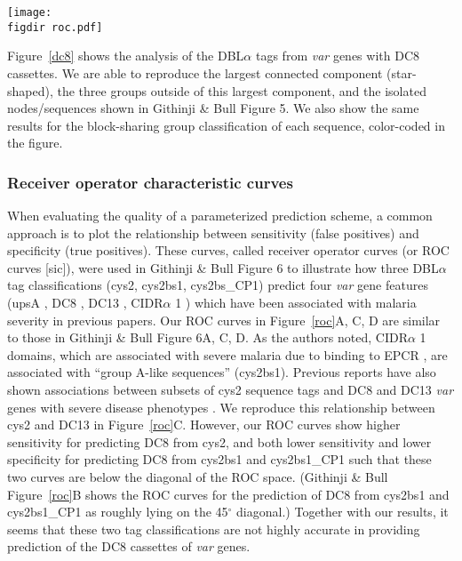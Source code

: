 \documentclass[10pt,twocolumn,superscriptaddress]{revtex4-1}
\newcommand{\var}{{\it var}\xspace}
\newcommand{\dbla}{{DBL$\alpha$}\xspace}
\newcommand{\cidra}{{CIDR$\alpha$}\xspace}
\newcommand{\cp}{{Cys/PoLV}\xspace}
\newcommand{\paper}{{Githinji \& Bull}\xspace}
\newcommand{\figdir}{figures/}
\begin{document}
\begin{figure*}[t]
	\centering
	\texttt{[image: \\figdir roc.pdf]}
	\caption{{\bf Receiver operator curves showing the sensitivity (true positive rate) and specificity (false positive rate) of three \dbla tag classifications (cys2, cys2bs1, cys2bs1\_CP1) in predicting four \var gene features associated with malaria severity: upsA , DC8, DC13 , \cidra1.} Sequences from the genomes 3D7 and IT4 were excluded because they were used in developing the BS classification.  cys2 = two cysteines within the tag region; cys2bs1 = tag sequences in block-sharing group1 AND have two cysteines, defined as ``group A-like''; cys2bs1\_CP1 = cys2bs1 OR in \cp group 1.}
	\label{roc}
\end{figure*}

Figure~\ref{dc8} shows the analysis of the \dbla tags from \var genes with DC8 cassettes. We are able to reproduce the largest connected component (star-shaped), the three groups outside of this largest component, and the isolated nodes/sequences shown in \paper Figure 5. We also show the same results for the block-sharing group classification of each sequence, color-coded in the figure.


\subsubsection{Receiver operator characteristic curves}
When evaluating the quality of a parameterized prediction scheme, a common approach is to plot the relationship between sensitivity (false positives) and specificity (true positives). These curves, called receiver operator curves (or ROC curves [sic]), were used in \paper Figure 6 to illustrate how three \dbla tag classifications (cys2, cys2bs1, cys2bs\_CP1) predict four \var gene features (upsA \cite{warimwe2012}, DC8 \cite{lavstsen2012} \cite{rask2010}, DC13 \cite{warimwe2012}, \cidra1 \cite{turner2013}) which have been associated with malaria severity in previous papers. Our ROC curves in Figure~\ref{roc}A, C, D are similar to those in \paper Figure 6A, C, D. As the authors noted, \cidra1 domains, which are associated with severe malaria due to binding to EPCR \cite{turner2013}, are associated with ``group A-like sequences'' (cys2bs1). Previous reports have also shown associations between subsets of cys2 sequence tags and DC8 and DC13 \var genes with severe disease phenotypes \cite{warimwe2012}. We reproduce this relationship between cys2 and DC13 in Figure~\ref{roc}C. However, our ROC curves show higher sensitivity for predicting DC8 from cys2, and both lower sensitivity and lower specificity for predicting DC8 from cys2bs1 and cys2bs1\_CP1 such that these two curves are below the diagonal of the ROC space. (\paper Figure~\ref{roc}B shows the ROC curves for the prediction of DC8 from cys2bs1 and cys2bs1\_CP1 as roughly lying on the 45$^{\circ}$ diagonal.) Together with our results, it seems that these two tag classifications are not highly accurate in providing prediction of the DC8 cassettes of \var genes. 
\end{document}
